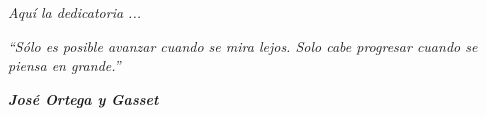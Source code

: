 
\clearpage

\textit{Aquí la dedicatoria ...}


\vspace{15cm}

{\large \textit{``Sólo es posible avanzar cuando se mira lejos. Solo cabe progresar cuando se piensa en grande.''}}

{\large \textbf{\textit{José Ortega y Gasset}}}

